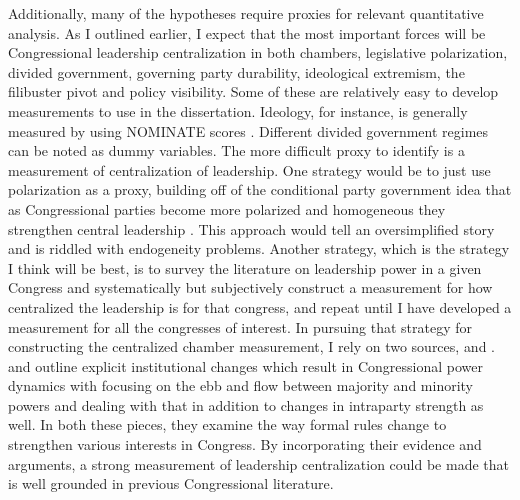 \documentclass[12pt]{article}
\begin{document}
Additionally, many of the hypotheses require proxies for relevant quantitative analysis. As I outlined earlier, I expect that the most important forces will be Congressional leadership centralization in both chambers, legislative polarization, divided government, governing party durability, ideological extremism, the filibuster pivot and policy visibility. Some of these are relatively easy to develop measurements to use in the dissertation. Ideology, for instance, is generally measured by using NOMINATE scores \citep{poole1997}. Different divided government regimes can be noted as dummy variables. The more difficult proxy to identify is a measurement of centralization  of leadership. One strategy would be to just use polarization as a proxy, building off of the conditional party government idea that as Congressional parties become more polarized and homogeneous they strengthen central leadership \citep{rohde1991}. This approach would tell an oversimplified story and is riddled with endogeneity problems. Another strategy, which is the strategy I think will be best, is to survey the literature on leadership power in a given Congress and systematically but subjectively construct a measurement for how centralized the leadership is for that congress, and repeat until I have developed a measurement for all the congresses of interest. In pursuing that strategy for constructing the centralized chamber measurement, I rely on two sources, \citet{binder1997} and \citet{schickler2001}. \cite{binder1997} and \cite{schickler2001} outline explicit institutional changes which result in Congressional power dynamics with \citet{binder1997} focusing on the ebb and flow between majority and minority powers and \citet{schickler2001} dealing with that in addition to changes in intraparty strength as well. In both these pieces, they examine the way formal rules change to strengthen various interests in Congress. By incorporating their evidence and arguments, a strong measurement of leadership centralization could be made that is well grounded in previous Congressional literature.
\end{document}
